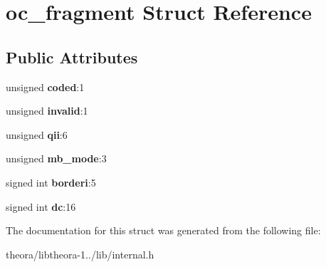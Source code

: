 \hypertarget{structoc__fragment}{\section{oc\+\_\+fragment Struct Reference}
\label{structoc__fragment}
}
\subsection*{Public Attributes}
\begin{DoxyCompactItemize}
\item 
\hypertarget{structoc__fragment_a98d48ad042ab08de97b69afba5c54775}{unsigned {\bfseries coded}\+:1}\label{structoc__fragment_a98d48ad042ab08de97b69afba5c54775}

\item 
\hypertarget{structoc__fragment_a6bb760029c12cd35c35790095e61f71a}{unsigned {\bfseries invalid}\+:1}\label{structoc__fragment_a6bb760029c12cd35c35790095e61f71a}

\item 
\hypertarget{structoc__fragment_ab0cff9eb42c286bcce2dc00d56790fe2}{unsigned {\bfseries qii}\+:6}\label{structoc__fragment_ab0cff9eb42c286bcce2dc00d56790fe2}

\item 
\hypertarget{structoc__fragment_af9d505968f8610a38ab7774298952007}{unsigned {\bfseries mb\+\_\+mode}\+:3}\label{structoc__fragment_af9d505968f8610a38ab7774298952007}

\item 
\hypertarget{structoc__fragment_ab7d897848f0a6952fcfd7d32dcb78958}{signed int {\bfseries borderi}\+:5}\label{structoc__fragment_ab7d897848f0a6952fcfd7d32dcb78958}

\item 
\hypertarget{structoc__fragment_ab5c07da239ecaf332fd7a0da068609f7}{signed int {\bfseries dc}\+:16}\label{structoc__fragment_ab5c07da239ecaf332fd7a0da068609f7}

\end{DoxyCompactItemize}


The documentation for this struct was generated from the following file\+:\begin{DoxyCompactItemize}
\item 
theora/libtheora-\/1../lib/internal.\+h\end{DoxyCompactItemize}
